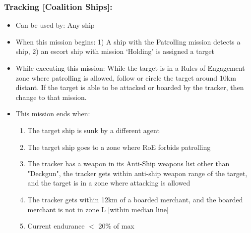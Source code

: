 \documentclass{article}
\begin{document}
    \subsubsection{Tracking [Coalition Ships]:}
            \begin{itemize}
                \item{Can be used by:} Any ship
                \item{When this mission begins:} 1) A ship with the Patrolling mission detects a ship, 2) an escort ship with mission `Holding' is assigned a target
                \item{While executing this mission:} While the target is in a Rules of Engagement zone where patrolling is allowed, follow or circle the target around 10km distant. If the target is able to be attacked or boarded by the tracker, then change to that mission.
                \item{This mission ends when:} 
                    \begin{enumerate}[label=\arabic*)]
                    \item The target ship is sunk by a different agent \par
                    [escort resumes player-assigned mission]
                    \item The target ship goes to a zone where RoE forbids patrolling \par
                    [escort resumes player-assigned mission]
                    \item The tracker has a weapon in its Anti-Ship weapons list other than "Deckgun", the tracker gets within anti-ship weapon range of the target, and the target is in a zone where attacking is allowed \par
                    [escort begins Attacking - Non-Deckgun]
                    \item The tracker gets within 12km of a boarded merchant, and the boarded merchant is not in zone L [within median line] \par
                    [escort begins liberation boarding]
                    \item Current endurance $<$ 20\% of max \par
                    [escort transits to base]
                    \end{enumerate}
            \end{itemize}
            
\end{document}
